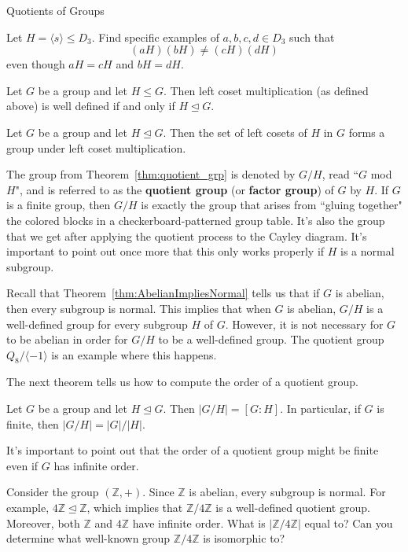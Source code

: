 \begin{section}{Quotients of Groups}
\begin{problem}
Let $H=\langle s\rangle \leq D_3$.  Find specific examples of $a,b,c,d\in D_3$ such that
\[
(aH)(bH)\neq (cH)(dH)
\]
even though $aH=cH$ and $bH=dH$.
\end{problem}

\begin{theorem}
Let $G$ be a group and let $H\leq G$.  Then left coset multiplication (as defined above) is well defined if and only if $H\trianglelefteq G$.
\end{theorem}

\begin{theorem}\label{thm:quotient_grp}
Let $G$ be a group and let $H\trianglelefteq G$.  Then the set of left cosets of $H$ in $G$ forms a group under left coset multiplication.
\end{theorem}

The group from Theorem~\ref{thm:quotient_grp} is denoted by $G/H$, read ``$G$ mod $H$", and is referred to as the \textbf{quotient group} (or \textbf{factor group}) of $G$ by $H$.  If $G$ is a finite group, then $G/H$ is exactly the group that arises from ``gluing together" the colored blocks in a checkerboard-patterned group table.  It's also the group that we get after applying the quotient process to the Cayley diagram.  It's important to point out once more that this only works properly if $H$ is a normal subgroup.

Recall that Theorem~\ref{thm:AbelianImpliesNormal} tells us that if $G$ is abelian, then every subgroup is normal.  This implies that when $G$ is abelian, $G/H$ is a well-defined group for every subgroup $H$ of $G$.  However, it is not necessary for $G$ to be abelian in order for $G/H$ to be a well-defined group.  The quotient group $Q_8/\langle -1\rangle$ is an example where this happens. 

The next theorem tells us how to compute the order of a quotient group.

\begin{theorem}
Let $G$ be a group and let $H\trianglelefteq G$.  Then $|G/H|=[G:H]$.  In particular, if $G$ is finite, then $|G/H|=|G|/|H|$.
\end{theorem}

It's important to point out that the order of a quotient group might be finite even if $G$ has infinite order.

\begin{problem}
Consider the group $(\mathbb{Z},+)$. Since $\mathbb{Z}$ is abelian, every subgroup is normal. For example, $4\mathbb{Z} \trianglelefteq \mathbb{Z}$, which implies that $\mathbb{Z}/4\mathbb{Z}$ is a well-defined quotient group.  Moreover, both $\mathbb{Z}$ and $4\mathbb{Z}$ have infinite order. What is $|\mathbb{Z}/4\mathbb{Z}|$ equal to?  Can you determine what well-known group $\mathbb{Z}/4\mathbb{Z}$ is isomorphic to?
\end{problem}


\end{section}
